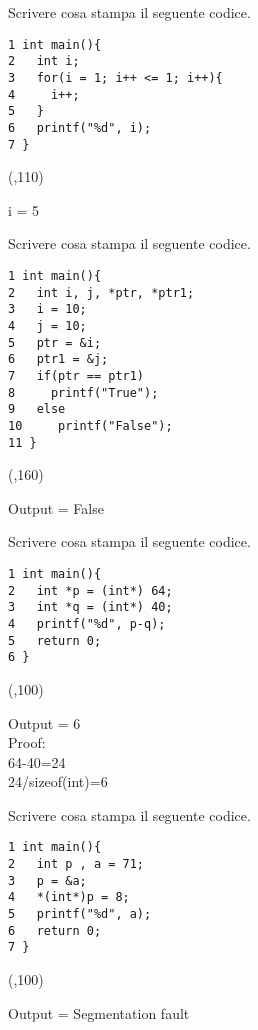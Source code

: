 \documentclass[addpoints,12pt]{exam}
\begin{document}
\begin{questions}
    \question[1] Scrivere cosa stampa il seguente codice.
    \setlength{\columnsep}{2cm}
    \begin{multicols}{2}
    \begin{verbatim}
1 int main(){
2   int i;
3   for(i = 1; i++ <= 1; i++){
4     i++;
5   }
6   printf("%d", i);
7 }
    \end{verbatim}
    \columnbreak
    \framebox(\linewidth,110){\parbox{1.5cm}{
    i = 5
    }}
    \end{multicols}

    \question[1] Scrivere cosa stampa il seguente codice.
    \setlength{\columnsep}{2cm}
    \begin{multicols}{2}
    \begin{verbatim}
1 int main(){
2   int i, j, *ptr, *ptr1;
3   i = 10;
4   j = 10;
5   ptr = &i;
6   ptr1 = &j;
7   if(ptr == ptr1)
8     printf("True");
9   else
10     printf("False");
11 }
    \end{verbatim}
    \columnbreak
    \framebox(\linewidth,160){\parbox{3cm}{
    Output = False
    }}
    \end{multicols}
    
    \question[2] Scrivere cosa stampa il seguente codice.
    \setlength{\columnsep}{2cm}
    \begin{multicols}{2}
    \begin{verbatim}
1 int main(){
2   int *p = (int*) 64;
3   int *q = (int*) 40;
4   printf("%d", p-q);
5   return 0;
6 }
    \end{verbatim}
    \columnbreak
    \framebox(\linewidth,100){\parbox{3cm}{
    Output = 6\\
    \newline
    Proof:\\
    64-40=24\\
    24/sizeof(int)=6
    }}
    \end{multicols}

    \newpage
    \thispagestyle{empty}
    \question[1] Scrivere cosa stampa il seguente codice.
    \setlength{\columnsep}{2cm}
    \begin{multicols}{2}
    \begin{verbatim}
1 int main(){
2   int p , a = 71;
3   p = &a;
4   *(int*)p = 8;
5   printf("%d", a);
6   return 0;
7 }
    \end{verbatim}
    \columnbreak
    \framebox(\linewidth,100){\parbox{5.5cm}{
    Output = Segmentation fault
    }}
    \end{multicols}


\end{questions}
\end{document}
